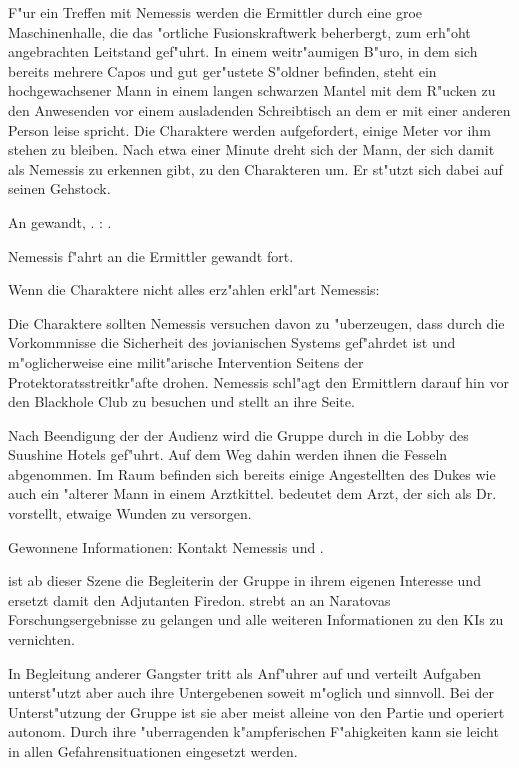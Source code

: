 F"ur ein Treffen mit Nemessis werden die Ermittler durch eine gro\3e Maschinenhalle, die das "ortliche Fusionskraftwerk beherbergt, zum erh"oht angebrachten Leitstand gef"uhrt. In einem weitr"aumigen B"uro, in dem sich bereits mehrere Capos und gut ger"ustete S"oldner befinden, steht ein hochgewachsener Mann in einem langen schwarzen Mantel mit dem R"ucken zu den Anwesenden vor einem ausladenden Schreibtisch an dem er mit einer anderen Person leise spricht. Die Charaktere werden aufgefordert, einige Meter vor ihm stehen zu bleiben. Nach etwa einer Minute dreht sich der Mann, der sich damit als Nemessis zu erkennen gibt, zu den Charakteren um. Er st"utzt sich dabei auf seinen Gehstock.


An \xl{} gewandt, . \xl{}:  . 

Nemessis f"ahrt an die Ermittler gewandt fort. 


Wenn die Charaktere nicht alles erz"ahlen erkl"art Nemessis:


Die Charaktere sollten Nemessis versuchen davon zu "uberzeugen, dass durch die Vorkommnisse die Sicherheit des jovianischen Systems gef"ahrdet ist und m"oglicherweise eine milit"arische Intervention Seitens der Protektoratsstreitkr"afte drohen. Nemessis schl"agt den Ermittlern darauf hin vor den Blackhole Club zu besuchen und stellt \xl{} an ihre Seite.

Nach Beendigung der der Audienz wird die Gruppe durch \xlsn{} in die Lobby des Suushine Hotels gef"uhrt. Auf dem Weg dahin werden ihnen die Fesseln abgenommen. Im Raum befinden sich bereits einige Angestellten des Dukes wie auch ein "alterer Mann in einem Arztkittel. \xlsn{} bedeutet dem Arzt, der sich als Dr.~  vorstellt, etwaige Wunden zu versorgen.

\begin{remarks}
	Gewonnene Informationen: Kontakt Nemessis und \xl{}.

	\xl{} ist ab dieser Szene die Begleiterin der Gruppe in ihrem eigenen Interesse und ersetzt damit den Adjutanten Firedon. \xl{} strebt an an Naratovas Forschungsergebnisse zu gelangen und alle weiteren Informationen zu den KIs zu vernichten.

	In Begleitung anderer Gangster tritt \xl{} als Anf"uhrer auf und verteilt Aufgaben unterst"utzt aber auch ihre Untergebenen soweit m"oglich und sinnvoll. Bei der Unterst"utzung der Gruppe ist sie aber meist alleine von den Partie und operiert autonom. Durch ihre "uberragenden k"ampferischen F"ahigkeiten kann sie leicht in allen Gefahrensituationen eingesetzt werden.
\end{remarks}
